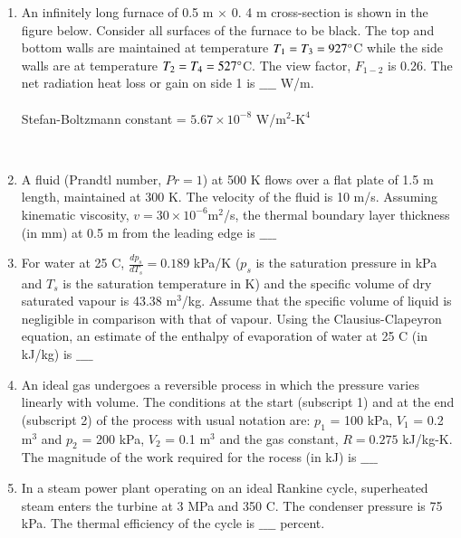 \documentclass[journal]{IEEEtran}
\begin{document}
\begin{enumerate}
\item An infinitely long furnace of 0.5 m $\times$ 0. 4 m cross-section is shown in the figure below. Consider all surfaces of the furnace to be black. The top and bottom walls are maintained at temperature $T_1 = T_3 = 927\degree $C while the side walls are at temperature $T_2 = T_4 = 527\degree$C. The view factor, $F_{1-2}$ is 0.26. The net radiation heat loss or gain on side 1 is $\_\_\_\_$ W/m. \\\\
Stefan-Boltzmann constant = $5.67 \times 10^{-8}$ W/$\text{m}^2$-$\text{K}^4$
\begin{figure}[!ht]
\centering
\resizebox{0.5\textwidth}{!}{%

}%
\end{figure} \\
\item A fluid (Prandtl number, $Pr = 1$) at 500 K flows over a flat plate of 1.5 m length, maintained at 300 K. The velocity of the fluid is 10 m/s. Assuming kinematic viscosity, $v = 30 \times 10^{-6} \text{m}^2$/s, the
thermal boundary layer thickness (in mm) at 0.5 m from the leading edge is $\_\_\_\_$ \\
\item For water at 25 \degree C, $\frac{dp_s}{dT_s} = 0.189$ kPa/K ($p_s$ is the saturation pressure in kPa and $T_s$ is the saturation temperature in K) and the specific volume of dry saturated vapour is 43.38 $\text{m}^3$/kg. Assume that the specific volume of liquid is negligible in comparison with that of vapour. Using the Clausius-Clapeyron equation, an estimate of the enthalpy of evaporation of water at 25 \degree C (in kJ/kg) is $\_\_\_\_$ \\
\item An ideal gas undergoes a reversible process in which the pressure varies linearly with volume. The conditions at the start (subscript 1) and at the end (subscript 2) of the process with usual notation are: $p_1$ = 100 kPa, $V_1$ = 0.2 $\text{m}^3$ and $p_2$ = 200 kPa, $V_2$ = 0.1 $\text{m}^3$ and the gas constant, $R = 0.275$ kJ/kg-K. The magnitude of the work required for the rocess (in kJ) is $\_\_\_\_$ \\
\item In a steam power plant operating on an ideal Rankine cycle, superheated steam enters the turbine at 3 MPa and 350 \degree C. The condenser pressure is 75 kPa. The thermal efficiency of the cycle is $\_\_\_\_$ percent. \\\\

\end{enumerate}
\end{document}
